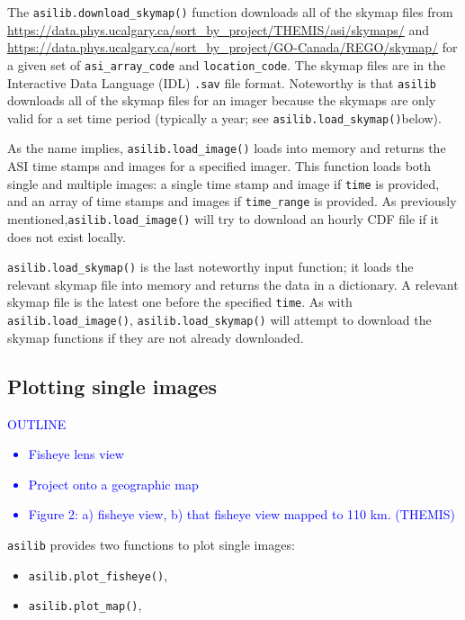\documentclass[draft]{agujournal2019}
\begin{document}
The \verb|asilib.download_skymap()| function downloads all of the skymap files from \url{https://data.phys.ucalgary.ca/sort_by_project/THEMIS/asi/skymaps/} and \url{https://data.phys.ucalgary.ca/sort_by_project/GO-Canada/REGO/skymap/} for a given set of \verb|asi_array_code| and \verb|location_code|. The skymap files are in the Interactive Data Language (IDL) \verb|.sav| file format. Noteworthy is that \verb|asilib| downloads all of the skymap files for an imager because the skymaps are only valid for a set time period (typically a year; see \verb|asilib.load_skymap()|below).

As the name implies, \verb|asilib.load_image()| loads into memory and returns the ASI time stamps and images for a specified imager. This function loads both single and multiple images: a single time stamp and image if \verb|time| is provided, and an array of time stamps and images if \verb|time_range| is provided. As previously mentioned,\verb|asilib.load_image()| will try to download an hourly CDF file if it does not exist locally.

\verb|asilib.load_skymap()| is the last noteworthy input function; it loads the relevant skymap file into memory and returns the data in a dictionary. A relevant skymap file is the latest one before the specified \verb|time|. As with \verb|asilib.load_image()|, \verb|asilib.load_skymap()| will attempt to download the skymap functions if they are not already downloaded.

\subsection{Plotting single images}
\textcolor{blue}{
      OUTLINE
      \begin{itemize}
            \item Fisheye lens view
            \item Project onto a geographic map
            \item Figure 2: a) fisheye view, b) that fisheye view mapped to 110 km. (THEMIS)
      \end{itemize}
}

\verb|asilib| provides two functions to plot single images:

\begin{itemize}
      \item \verb|asilib.plot_fisheye()|,
      \item \verb|asilib.plot_map()|,
\end{itemize}
\end{document}
